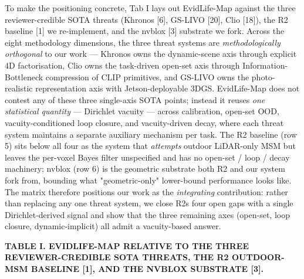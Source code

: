 \documentclass[
]{article}
\begin{document}
To make the positioning concrete, Tab I lays out EvidLife-Map against
the three reviewer-credible SOTA threats (Khronos {[}6{]}, GS-LIVO
{[}20{]}, Clio {[}18{]}), the R2 baseline {[}1{]} we re-implement, and
the nvblox {[}3{]} substrate we fork. Across the eight methodology
dimensions, the three threat systems are \emph{methodologically
orthogonal} to our work --- Khronos owns the dynamic-scene axis through
explicit 4D factorisation, Clio owns the task-driven open-set axis
through Information-Bottleneck compression of CLIP primitives, and
GS-LIVO owns the photo-realistic representation axis with
Jetson-deployable 3DGS. EvidLife-Map does not contest any of these three
single-axis SOTA points; instead it reuses \emph{one statistical
quantity} --- Dirichlet vacuity --- across calibration, open-set OOD,
vacuity-conditioned loop closure, and vacuity-driven decay, where each
threat system maintains a separate auxiliary mechanism per task. The R2
baseline (row 5) sits below all four as the system that \emph{attempts}
outdoor LiDAR-only MSM but leaves the per-voxel Bayes filter unspecified
and has no open-set / loop / decay machinery; nvblox (row 6) is the
geometric substrate both R2 and our system fork from, bounding what
"geometric-only" lower-bound performance looks like. The matrix
therefore positions our work as the \emph{integrating} contribution:
rather than replacing any one threat system, we close
R2\textquotesingle s four open gaps with a single Dirichlet-derived
signal and show that the three remaining axes (open-set, loop closure,
dynamic-implicit) all admit a vacuity-based answer.

\textbf{TABLE I. EVIDLIFE-MAP RELATIVE TO THE THREE REVIEWER-CREDIBLE
SOTA THREATS, THE R2 OUTDOOR-MSM BASELINE {[}1{]}, AND THE NVBLOX
SUBSTRATE {[}3{]}.}
\end{document}
